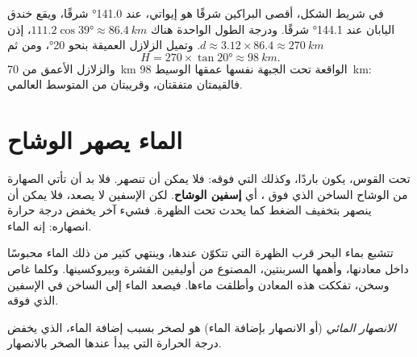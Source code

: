 \begin{example}\label{ex:g12:subduction-magmatism:japan}
في شريط الشكل، أقصى البراكين شرقًا هو إيواتي، عند \ang{141.0} شرقًا،
ويقع خندق اليابان عند \ang{144.1} شرقًا. ودرجة الطول الواحدة هناك
$111.2\cos\ang{39} \approx \qty{86.4}{km}$، إذن $d \approx 3.12 \times 86.4
\approx \qty{270}{km}$. وتميل الزلازل العميقة بنحو \ang{20}، ومن ثم
\[
  H = 270 \times \tan\ang{20} \approx \qty{98}{km}.
\]
والزلازل الأعمق من \qty{70}{km} الواقعة تحت الجبهة نفسها
عمقها الوسيط \qty{98}{km}: فالقيمتان متفقتان، وقريبتان من المتوسط
العالمي.
\end{example}

\section{الماء يصهر الوشاح}

تحت القوس، يكون  باردًا، وكذلك  التي فوقه:
فلا يمكن أن تنصهر. فلا بد أن تأتي الصهارة من الوشاح الساخن الذي فوق ،
أي \textbf{إسفين الوشاح}. لكن الإسفين لا يصعد، فلا يمكن أن ينصهر بتخفيف
الضغط كما يحدث تحت الظهرة. فشيء آخر يخفض درجة حرارة
انصهاره: إنه الماء.

تتشبع  بماء البحر قرب الظهرة التي تتكوّن عندها،
وينتهي كثير من ذلك الماء محبوسًا داخل معادنها، وأهمها
السربنتين، المصنوع من أوليفين القشرة وبيروكسينها. وكلما غاص 
وسخن، تفككت هذه المعادن وأطلقت ماءها.
فيصعد الماء إلى  الساخن في الإسفين الذي فوقه.

\begin{definition}\label{def:g12:subduction-magmatism:hydrous-melting}
\emph{الانصهار المائي} (أو الانصهار بإضافة الماء) هو
 لصخر بسبب إضافة الماء، الذي يخفض
درجة الحرارة التي يبدأ عندها الصخر بالانصهار.
\end{definition}

